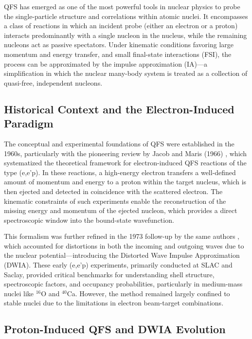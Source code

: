 \gls{QFS} has emerged as one of the most powerful tools in nuclear physics to probe the single-particle structure and correlations within atomic nuclei. It encompasses a class of reactions in which an incident probe (either an electron or a proton) interacts predominantly with a single nucleon in the nucleus, while the remaining nucleons act as passive spectators. Under kinematic conditions favoring large momentum and energy transfer, and small final-state interactions (FSI), the process can be approximated by the impulse approximation (IA)—a simplification in which the nuclear many-body system is treated as a collection of quasi-free, independent nucleons.


\subsection{Historical Context and the Electron-Induced Paradigm}

The conceptual and experimental foundations of \gls{QFS} were established in the 1960s, particularly with the pioneering review by Jacob and Maris (1966) \cite{jacob_quasi-free_1966}, which systematized the theoretical framework for electron-induced \gls{QFS} reactions of the type (e,e'p). In these reactions, a high-energy electron transfers a well-defined amount of momentum and energy to a proton within the target nucleus, which is then ejected and detected in coincidence with the scattered electron. The kinematic constraints of such experiments enable the reconstruction of the missing energy and momentum of the ejected nucleon, which provides a direct spectroscopic window into the bound-state wavefunction.

This formalism was further refined in the 1973 follow-up by the same authors \cite{jacob_quasi-free_1973}, which accounted for distortions in both the incoming and outgoing waves due to the nuclear potential—introducing the Distorted Wave Impulse Approximation (DWIA). These early (e,e'p) experiments, primarily conducted at SLAC and Saclay, provided critical benchmarks for understanding shell structure, spectroscopic factors, and occupancy probabilities, particularly in medium-mass nuclei like $^{16}$O and $^{40}$Ca. However, the method remained largely confined to stable nuclei due to the limitations in electron beam-target combinations.


\subsection{Proton-Induced QFS and DWIA Evolution}


